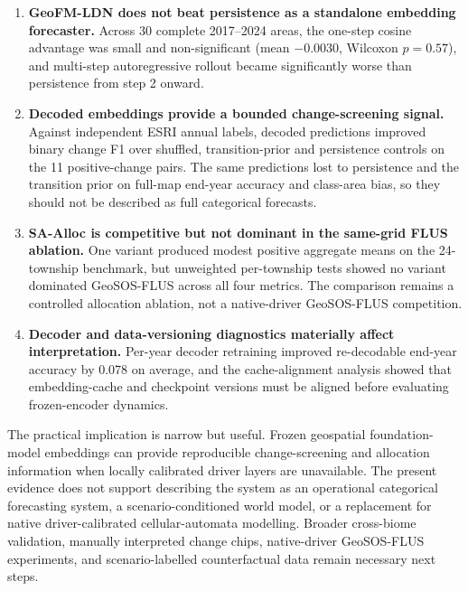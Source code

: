 \documentclass{article}
\begin{document}
\begin{enumerate}
\item \textbf{GeoFM-LDN does not beat persistence as a standalone embedding forecaster.} Across 30 complete 2017--2024 areas, the one-step cosine advantage was small and non-significant (mean $-0.0030$, Wilcoxon $p=0.57$), and multi-step autoregressive rollout became significantly worse than persistence from step 2 onward.

\item \textbf{Decoded embeddings provide a bounded change-screening signal.} Against independent ESRI annual labels, decoded predictions improved binary change F1 over shuffled, transition-prior and persistence controls on the 11 positive-change pairs. The same predictions lost to persistence and the transition prior on full-map end-year accuracy and class-area bias, so they should not be described as full categorical forecasts.

\item \textbf{SA-Alloc is competitive but not dominant in the same-grid FLUS ablation.} One variant produced modest positive aggregate means on the 24-township benchmark, but unweighted per-township tests showed no variant dominated GeoSOS-FLUS across all four metrics. The comparison remains a controlled allocation ablation, not a native-driver GeoSOS-FLUS competition.

\item \textbf{Decoder and data-versioning diagnostics materially affect interpretation.} Per-year decoder retraining improved re-decodable end-year accuracy by 0.078 on average, and the cache-alignment analysis showed that embedding-cache and checkpoint versions must be aligned before evaluating frozen-encoder dynamics.
\end{enumerate}

The practical implication is narrow but useful. Frozen geospatial foundation-model embeddings can provide reproducible change-screening and allocation information when locally calibrated driver layers are unavailable. The present evidence does not support describing the system as an operational categorical forecasting system, a scenario-conditioned world model, or a replacement for native driver-calibrated cellular-automata modelling. Broader cross-biome validation, manually interpreted change chips, native-driver GeoSOS-FLUS experiments, and scenario-labelled counterfactual data remain necessary next steps.


\end{document}
